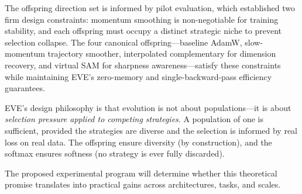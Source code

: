 \documentclass[12pt]{article}
\begin{document}
The offspring direction set is informed by pilot evaluation, which
established two firm design constraints: momentum smoothing is
non-negotiable for training stability, and each offspring must occupy
a distinct strategic niche to prevent selection collapse.
The four canonical offspring---baseline AdamW, slow-momentum trajectory
smoother, interpolated complementary for dimension recovery, and
virtual SAM for sharpness awareness---satisfy these constraints while
maintaining EVE's zero-memory and single-backward-pass efficiency
guarantees.

EVE's design philosophy is that evolution is not about populations---it
is about \emph{selection pressure applied to competing strategies}.
A population of one is sufficient, provided the strategies are diverse
and the selection is informed by real loss on real data.
The offspring ensure diversity (by construction), and the softmax
ensures softness (no strategy is ever fully discarded).

The proposed experimental program will determine whether this theoretical
promise translates into practical gains across architectures, tasks, and
scales.
\end{document}
